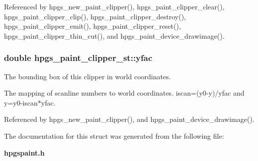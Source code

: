 Referenced by hpgs\_\-new\_\-paint\_\-clipper(), hpgs\_\-paint\_\-clipper\_\-clear(), hpgs\_\-paint\_\-clipper\_\-clip(), hpgs\_\-paint\_\-clipper\_\-destroy(), hpgs\_\-paint\_\-clipper\_\-emit(), hpgs\_\-paint\_\-clipper\_\-reset(), hpgs\_\-paint\_\-clipper\_\-thin\_\-cut(), and hpgs\_\-paint\_\-device\_\-drawimage().

\subsubsection[{yfac}]{\setlength{\rightskip}{0pt plus 5cm}double {\bf hpgs\_\-paint\_\-clipper\_\-st::yfac}}\label{structhpgs__paint__clipper__st_a0cdd33a5c1f522e1445d74fd18ec2da2}
The bounding box of this clipper in world coordinates.

The mapping of scanline numbers to world coordinates. {\ttfamily iscan=}(y0-\/y)/yfac and {\ttfamily y=y0-\/iscan$\ast$yfac}. 

Referenced by hpgs\_\-new\_\-paint\_\-clipper(), and hpgs\_\-paint\_\-device\_\-drawimage().



The documentation for this struct was generated from the following file:\begin{DoxyCompactItemize}
\item 
{\bf hpgspaint.h}\end{DoxyCompactItemize}
